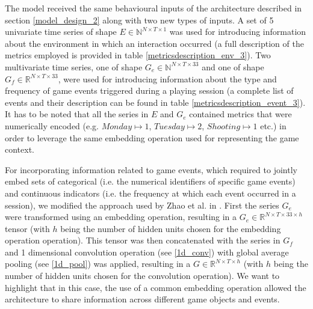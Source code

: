 

The model received the same behavioural inputs of the architecture described in section \ref{model_design_2} along with two new types of inputs. A set of 5 univariate time series of shape $E \in \mathbb{N}^{N \times T \times 1}$ was used for introducing information about the environment in which an interaction occurred (a full description of the metrics employed is provided in table \ref{metricsdescription_env_3}). Two multivariate time series, one of shape $G_e \in \mathbb{N}^{N \times T \times 33}$  and one of shape $G_f \in \mathbb{R}^{N \times T \times 33}$, were used for introducing information about the type and frequency of game events triggered during a playing session (a complete list of events and their description can be found in table \ref{metricsdescription_event_3}). It has to be noted that all the series in $E$ and $G_e$ contained metrics that were numerically encoded (e.g. $Monday \mapsto 1$, $Tuesday \mapsto 2$, $Shooting \mapsto 1$ etc.) in order to leverage the same embedding operation used for representing the game context. 

For incorporating information related to game events, which required to jointly embed sets of categorical (i.e. the numerical identifiers of specific game events) and continuous indicators (i.e. the frequency at which each event occurred in a session), we modified the approach used by Zhao et al. in \cite{zhao2020multi}. First the series $G_e$ were transformed using an embedding operation, resulting in a  $G_e  \in \mathbb{R}^{N \times T \times 33 \times h}$ tensor (with $h$ being the number of hidden units chosen for the embedding operation operation). This tensor was then concatenated with the series in $G_f$ and 1 dimensional convolution operation (see \ref{1d_conv}) with global average pooling (see \ref{1d_pool}) was applied, resulting in a $G  \in \mathbb{R}^{N \times T \times h}$ (with $h$ being the number of hidden units chosen for the convolution operation). We want to highlight that in this case, the use of a common embedding operation allowed the architecture to share information across different game objects and events. 

